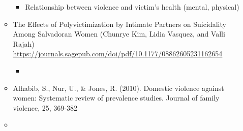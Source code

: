 \documentclass[letterpaper, 10pt]{article}
\begin{document}
\begin{enumerate}
\begin{itemize}
        \begin{itemize}
            \item Relationship between violence and victim's health (mental, physical)
        \end{itemize}
        \item The Effects of Polyvictimization by Intimate Partners on Suicidality Among Salvadoran Women (Chunrye Kim, Lidia Vasquez, and Valli Rajah) \url{https://journals.sagepub.com/doi/pdf/10.1177/08862605231162654}
        \begin{itemize}
            \item 
        \end{itemize}
        \item  Alhabib, S., Nur, U., \& Jones, R. (2010). Domestic violence against women: Systematic review of prevalence studies. Journal of family violence, 25, 369-382
        \item  
    \end{itemize}


\end{enumerate}
\end{document}
